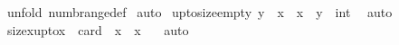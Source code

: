 \begin{isabellebody}
%
\isadelimproof
%
\endisadelimproof
%
\isatagproof
{}\isamarkupfalse%
\ {\isacharparenleft}unfold\ numb{\isacharunderscore}range{\isacharunderscore}def{\isacharparenright}\isanewline
{}\isamarkupfalse%
\ auto\isanewline
{}\isamarkupfalse%
%
\endisatagproof
{\isafoldproof}%
%
\isadelimproof
\isanewline
%
\endisadelimproof
\isanewline
\isanewline
{}\isamarkupfalse%
\ upto{\isacharunderscore}size{\isacharunderscore}empty{\isacharcolon}\ {\isachardoublequoteopen}y\ {\isacharless}\ x\ {\isacharequal}{\isacharequal}{\isachargreater}\ {\isacharhash}{\isacharparenleft}x\ {\isachardot}{\isachardot}\ y{\isacharparenright}\ {\isacharequal}\ int\ {}{\isachardoublequoteclose}\isanewline
%
\isadelimproof
%
\endisadelimproof
%
\isatagproof
{}\isamarkupfalse%
\ auto\isanewline
{}\isamarkupfalse%
%
\endisatagproof
{\isafoldproof}%
%
\isadelimproof
\isanewline
%
\endisadelimproof
\isanewline
\isanewline
{}\isamarkupfalse%
\ size{\isacharunderscore}x{\isacharunderscore}upto{\isacharunderscore}x{\isacharcolon}\ \ {\isachardoublequoteopen}card\ {\isacharparenleft}\ x\ {\isachardot}{\isachardot}\ x{\isacharparenright}\ {\isacharequal}\ {}{\isachardoublequoteclose}\isanewline
%
\isadelimproof
%
\endisadelimproof
%
\isatagproof
{}\isamarkupfalse%
\ auto\isanewline
{}\isamarkupfalse%
%
\endisatagproof
{\isafoldproof}%
%
\isadelimproof
\isanewline
%
\endisadelimproof
\isanewline
\isanewline
\isanewline
\isanewline
\isanewline
%
\isadelimtheory
\isanewline
%
\endisadelimtheory
%
\isatagtheory
{}\isamarkupfalse%
%
\endisatagtheory
{\isafoldtheory}%
%
\isadelimtheory
\isanewline
%
\endisadelimtheory
\end{isabellebody}%
